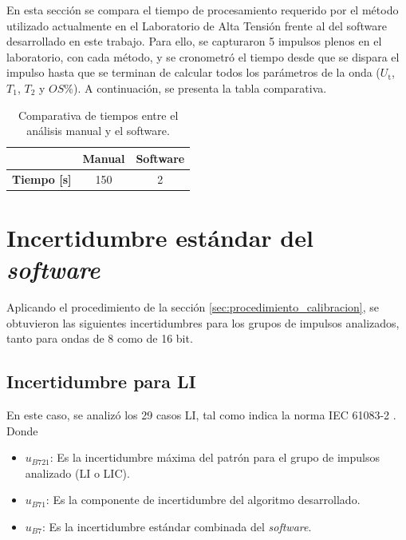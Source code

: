 En esta sección se compara el tiempo de procesamiento requerido por el método utilizado actualmente en el Laboratorio de Alta Tensión frente al del software desarrollado en este trabajo. Para ello, se capturaron 5 impulsos plenos en el laboratorio, con cada método, y se cronometró el tiempo desde que se dispara el impulso hasta que se terminan de calcular todos los parámetros de la onda ($U_\text{t}$, $T_1$, $T_2$ y $OS\%$). A continuación, se presenta la tabla comparativa.

\begin{table}[H]
    \centering
    \begin{tabular}{@{}ccc@{}}
        \toprule
                            & \textbf{Manual} & \textbf{Software} \\ \midrule
        \textbf{Tiempo [s]} & 150             & 2                 \\ \bottomrule
    \end{tabular}
    \caption{Comparativa de tiempos entre el análisis manual y el software.}
    \label{tab:tiempo_manual_software}
\end{table}

\section{Incertidumbre estándar del \emph{software}}
\label{sec:incertidumbre_software}

Aplicando el procedimiento de la sección \ref{sec:procedimiento_calibracion}, se obtuvieron las siguientes incertidumbres para los grupos de impulsos analizados, tanto para ondas de \num{8} como de \num{16} bit.

\subsection{Incertidumbre para LI}
\label{subsec:incertidumbre_software_li}

En este caso, se analizó los \num{29} casos LI, tal como indica la norma IEC 61083-2 \cite{iec61083_2}.
Donde
\begin{itemize}
    \item \textbf{$u_{B721}$}: Es la incertidumbre máxima del patrón \cite{iec61083_2} para el grupo de impulsos analizado (LI o LIC).
    \item \textbf{$u_{B71}$}: Es la componente de incertidumbre del algoritmo desarrollado.
    \item \textbf{$u_{B7}$}: Es la incertidumbre estándar combinada del \emph{software}.
\end{itemize}


